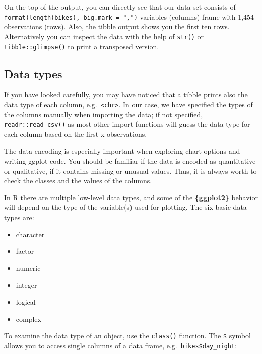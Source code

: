 \documentclass[
]{krantz}
\providecommand{\tightlist}{%
  \setlength{\itemsep}{0pt}\setlength{\parskip}{0pt}}
\begin{document}
On the top of the output, you can directly see that our data set consists of \texttt{format(length(bikes),\ big.mark\ =\ ",")} variables (columns) frame with 1,454 observations (rows). Also, the tibble output shows you the first ten rows. Alternatively you can inspect the data with the help of \texttt{str()} or \texttt{tibble::glimpse()} to print a transposed version.

\hypertarget{classes}{%
\subsection{Data types}\label{classes}}

If you have looked carefully, you may have noticed that a tibble prints also the data type of each column, e.g.~\texttt{\textless{}chr\textgreater{}}. In our case, we have specified the types of the columns manually when importing the data; if not specified, \texttt{readr::read\_csv()} as most other import functions will guess the data type for each column based on the first x observations.

The data encoding is especially important when exploring chart options and writing ggplot code. You should be familiar if the data is encoded as quantitative or qualitative, if it contains missing or unusual values. Thus, it is always worth to check the classes and the values of the columns.

In R there are multiple low-level data types, and some of the \textbf{\{ggplot2\}} behavior will depend on the type of the variable(s) used for plotting. The six basic data types are:

\begin{itemize}
\tightlist
\item
  character
\item
  factor
\item
  numeric
\item
  integer
\item
  logical
\item
  complex
\end{itemize}

To examine the data type of an object, use the \texttt{class()} function. The \texttt{\$} symbol allows you to access single columns of a data frame, e.g.~\texttt{bikes\$day\_night}:
\end{document}
